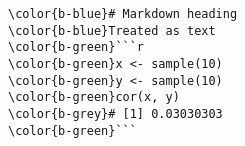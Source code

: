 \documentclass[class=minimal,border=0]{standalone}
\begin{document}
%
\begin{BVerbatim}[bgcolor=b-darkgrey]
\color{b-blue}# Markdown heading
\color{b-blue}Treated as text
\color{b-green}```r
\color{b-green}x <- sample(10)
\color{b-green}y <- sample(10)
\color{b-green}cor(x, y)
\color{b-grey}# [1] 0.03030303
\color{b-green}```
\end{BVerbatim}
\end{document}
